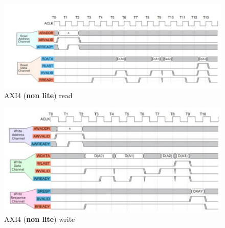 \begin{figure}[!ht]
\includegraphics[width=1\textwidth]{./../../img/Images/axi_simple_read}
\caption{AXI4 ({\bf non lite}) read}
\label{simple_read}
\end{figure}
\begin{figure}[!ht]
\includegraphics[width=1\textwidth]{./../../img/Images/axi_simple_write}
\caption{AXI4 ({\bf non lite}) write}
\label{simple_write}
\end{figure}

